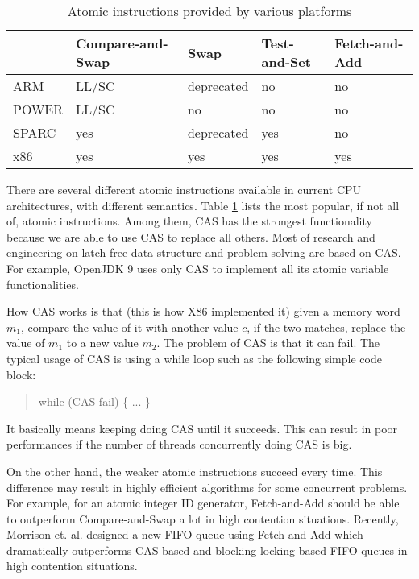 \documentclass{sig-alternate}
\begin{document}
\begin{table}
  \label{table:atomic_instructions}
  \caption{Atomic instructions provided by various platforms}
  \begin{tabular}{ l || p{1.5cm} | p{1.5cm} | p{1.2cm} | p{1.2cm} }
    & Compare-and-Swap & Swap & Test-and-Set & Fetch-and-Add \\ \hline
    ARM & LL/SC & deprecated & no & no \\
    POWER & LL/SC & no & no & no \\
    SPARC & yes & deprecated & yes & no \\
    x86 & yes & yes& yes & yes \\ \hline
  \end{tabular}
\end{table}


There are several different atomic instructions available in current
CPU architectures, with different semantics. Table
\ref{table:atomic_instructions} lists the most popular, if not all of,
atomic instructions. Among them, CAS has the strongest functionality
because we are able to use CAS to replace all others. Most of research
and engineering on latch free data structure and problem solving are
based on CAS. For example, OpenJDK 9 uses only CAS to implement all
its atomic variable functionalities.

How CAS works is that (this is how X86 implemented it) given a memory
word $m_1$, compare the value of it with another value $c$, if the two
matches, replace the value of $m_1$ to a new value $m_2$.  The problem
of CAS is that it can fail. The typical usage of CAS is using a while
loop such as the following simple code block:

\begin{quote}
  while (CAS fail) \{
    ...
  \} 
\end{quote}

It basically means keeping doing CAS until it succeeds. This can
result in poor performances if the number of threads concurrently
doing CAS is big.


On the other hand, the weaker atomic instructions succeed every time.
This difference may result in highly efficient algorithms for some
concurrent problems. For example, for an atomic integer ID generator,
Fetch-and-Add should be able to outperform Compare-and-Swap a lot
in high contention situations. Recently, Morrison et. al. designed a
new FIFO queue using Fetch-and-Add \cite{Morrison:2013} which
dramatically outperforms CAS based and blocking locking based FIFO
queues in high contention situations.
\end{document}
